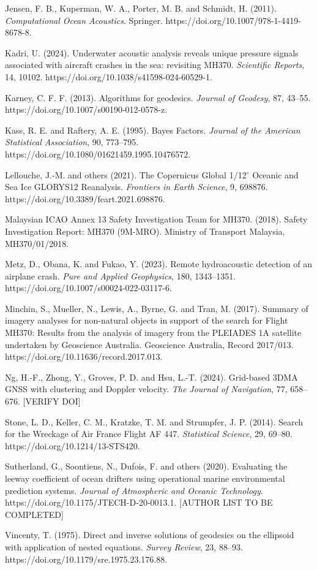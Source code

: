 \documentclass[12pt,a4paper]{article}
\begin{document}
Jensen, F. B., Kuperman, W. A., Porter, M. B. and Schmidt, H. (2011). \textit{Computational
Ocean Acoustics}. Springer. https://doi.org/10.1007/978-1-4419-8678-8.

Kadri, U. (2024). Underwater acoustic analysis reveals unique pressure signals associated with
aircraft crashes in the sea: revisiting MH370. \textit{Scientific Reports}, 14, 10102.
https://doi.org/10.1038/s41598-024-60529-1.

Karney, C. F. F. (2013). Algorithms for geodesics. \textit{Journal of Geodesy}, 87, 43--55.
https://doi.org/10.1007/s00190-012-0578-z.

Kass, R. E. and Raftery, A. E. (1995). Bayes Factors. \textit{Journal of the American
Statistical Association}, 90, 773--795. https://doi.org/10.1080/01621459.1995.10476572.

Lellouche, J.-M. and others (2021). The Copernicus Global 1/12$^\circ$ Oceanic and Sea Ice
GLORYS12 Reanalysis. \textit{Frontiers in Earth Science}, 9, 698876.
https://doi.org/10.3389/feart.2021.698876.

Malaysian ICAO Annex 13 Safety Investigation Team for MH370. (2018). Safety Investigation
Report: MH370 (9M-MRO). Ministry of Transport Malaysia, MH370/01/2018.

Metz, D., Obana, K. and Fukao, Y. (2023). Remote hydroacoustic detection of an airplane crash.
\textit{Pure and Applied Geophysics}, 180, 1343--1351.
https://doi.org/10.1007/s00024-022-03117-6.

Minchin, S., Mueller, N., Lewis, A., Byrne, G. and Tran, M. (2017). Summary of imagery analyses
for non-natural objects in support of the search for Flight MH370: Results from the analysis of
imagery from the PLEIADES 1A satellite undertaken by Geoscience Australia. Geoscience
Australia, Record 2017/013. https://doi.org/10.11636/record.2017.013.

Ng, H.-F., Zhong, Y., Groves, P. D. and Hsu, L.-T. (2024). Grid-based 3DMA GNSS with clustering
and Doppler velocity. \textit{The Journal of Navigation}, 77, 658--676. [VERIFY DOI]

Stone, L. D., Keller, C. M., Kratzke, T. M. and Strumpfer, J. P. (2014). Search for the
Wreckage of Air France Flight AF 447. \textit{Statistical Science}, 29, 69--80.
https://doi.org/10.1214/13-STS420.

Sutherland, G., Soontiens, N., Dufois, F. and others (2020). Evaluating the leeway coefficient
of ocean drifters using operational marine environmental prediction systems. \textit{Journal of
Atmospheric and Oceanic Technology}. https://doi.org/10.1175/JTECH-D-20-0013.1.
[AUTHOR LIST TO BE COMPLETED]

Vincenty, T. (1975). Direct and inverse solutions of geodesics on the ellipsoid with application
of nested equations. \textit{Survey Review}, 23, 88--93.
https://doi.org/10.1179/sre.1975.23.176.88.

\endgroup
\end{document}
